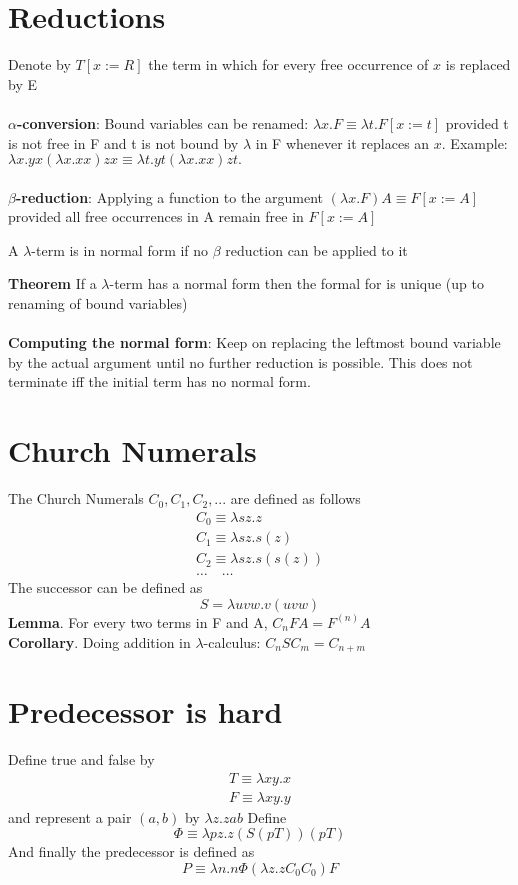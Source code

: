 \documentclass{article}[18pt]
\begin{document}
\section{Reductions}
Denote by $T[x:= R]$ the term in which for every free occurrence of $x$ is replaced by E\\
\\
\textbf{$\alpha$-conversion}: Bound variables can be renamed: $\lambda x.F \equiv \lambda t.F[x:=t]$ provided t is not free in F and t is not bound by $\lambda$ in F whenever it replaces an $x$. Example: $\lambda x.yx(\lambda x.xx)zx \equiv \lambda t.yt(\lambda x.xx)zt.$\\
\\
\textbf{$\beta$-reduction}: Applying a function to the argument $(\lambda x.F)A \equiv F[x:=A]$ provided all free occurrences in A remain free in $F[x:=A]$
\begin{defin}
A $\lambda$-term is in normal form if no $\beta$ reduction can be applied to it
\end{defin}
\textbf{Theorem} If a $\lambda$-term has a normal form then the formal for is unique (up to renaming of bound variables)\\
\\
\textbf{Computing the normal form}: Keep on replacing the leftmost bound variable by the actual argument until no further reduction is possible. This does not terminate iff the initial term has no normal form.
\section{Church Numerals}
The Church Numerals $C_0,C_1,C_2,...$ are defined as follows
\[
\begin{array}{l}{C_{0} \equiv \lambda s z . z} \\ {C_{1} \equiv \lambda s z . s(z)} \\ {C_{2} \equiv \lambda s z . s(s(z))} \\ {\ldots \quad \ldots}\end{array}
\]
The successor can be defined as
$$S=\lambda uvw.v(uvw)$$
\textbf{Lemma}. For every two terms in F and A, $C_nFA=F^{(n)}A$\\
\textbf{Corollary}. Doing addition in $\lambda$-calculus: $C_nSC_m=C_{n+m}$
\section{Predecessor is hard}
Define true and false by
\[
\begin{array}{l}{T \equiv \lambda x y . x} \\ {F \equiv \lambda x y . y}\end{array}
\]
and represent a pair $(a,b)$ by $\lambda z.zab$ Define
\[
\Phi \equiv \lambda p z . z(S(p T))(p T)
\]
And finally the predecessor is defined as
\[
P \equiv \lambda n . n \Phi\left(\lambda z . z C_{0} C_{0}\right) F
\]
\end{document}
